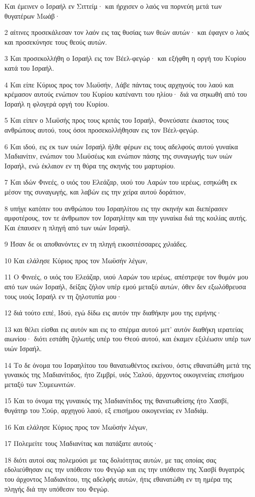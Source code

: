 \par Και έμεινεν ο Ισραήλ εν Σιττείμ· και ήρχισεν ο λαός να πορνεύη μετά των θυγατέρων Μωάβ·
\par 2 αίτινες προσεκάλεσαν τον λαόν εις τας θυσίας των θεών αυτών· και έφαγεν ο λαός και προσεκύνησε τους θεούς αυτών.
\par 3 Και προσεκολλήθη ο Ισραήλ εις τον Βέελ-φεγώρ· και εξήφθη η οργή του Κυρίου κατά του Ισραήλ.
\par 4 Και είπε Κύριος προς τον Μωϋσήν, Λάβε πάντας τους αρχηγούς του λαού και κρέμασον αυτούς ενώπιον του Κυρίου κατέναντι του ηλίου· διά να σηκωθή από του Ισραήλ η φλογερά οργή του Κυρίου.
\par 5 Και είπεν ο Μωϋσής προς τους κριτάς του Ισραήλ, Φονεύσατε έκαστος τους ανθρώπους αυτού, τους όσοι προσεκολλήθησαν εις τον Βέελ-φεγώρ.
\par 6 Και ιδού, εις εκ των υιών Ισραήλ ήλθε φέρων εις τους αδελφούς αυτού γυναίκα Μαδιανίτιν, ενώπιον του Μωϋσέως και ενώπιον πάσης της συναγωγής των υιών Ισραήλ, ενώ έκλαιον εν τη θύρα της σκηνής του μαρτυρίου.
\par 7 Και ιδών Φινεές, ο υιός του Ελεάζαρ, υιού του Ααρών του ιερέως, εσηκώθη εκ μέσον της συναγωγής, και λαβών εις την χείρα αυτού δοράτιον,
\par 8 υπήγε κατόπιν του ανθρώπου του Ισραηλίτου εις την σκηνήν και διεπέρασεν αμφοτέρους, τον τε άνθρωπον τον Ισραηλίτην και την γυναίκα διά της κοιλίας αυτής. Και έπαυσεν η πληγή από των υιών Ισραήλ.
\par 9 Ήσαν δε οι αποθανόντες εν τη πληγή εικοσιτέσσαρες χιλιάδες.
\par 10 Και ελάλησε Κύριος προς τον Μωϋσήν λέγων,
\par 11 Ο Φινεές, ο υιός του Ελεάζαρ, υιού Ααρών του ιερέως, απέστρεψε τον θυμόν μου από των υιών Ισραήλ, δείξας ζήλον υπέρ εμού μεταξύ αυτών, όθεν δεν εξωλόθρευσα τους υιούς Ισραήλ εν τη ζηλοτυπία μου·
\par 12 διά τούτο ειπέ, Ιδού, εγώ δίδω εις αυτόν την διαθήκην μου της ειρήνης·
\par 13 και θέλει είσθαι εις αυτόν και εις το σπέρμα αυτού μετ' αυτόν διαθήκη ιερατείας αιωνίου· διότι εστάθη ζηλωτής υπέρ του Θεού αυτού, και έκαμεν εξιλέωσιν υπέρ των υιών Ισραήλ.
\par 14 Το δε όνομα του Ισραηλίτου του θανατωθέντος εκείνου, όστις εθανατώθη μετά της γυναικός της Μαδιανίτιδος, ήτο Ζιμβρί, υιός Σαλού, άρχοντος οικογενείας επισήμου μεταξύ των Συμεωνιτών.
\par 15 Και το όνομα της γυναικός της Μαδιανίτιδος της θανατωθείσης ήτο Χασβί, θυγάτηρ του Σούρ, αρχηγού λαού, εξ επισήμου οικογενείας εν Μαδιάμ.
\par 16 Και ελάλησε Κύριος προς τον Μωϋσήν λέγων,
\par 17 Πολεμείτε τους Μαδιανίτας και πατάξατε αυτούς·
\par 18 διότι αυτοί σας πολεμούσι με τας δολιότητας αυτών, με τας οποίας σας εδολιεύθησαν εις την υπόθεσιν του Φεγώρ και εις την υπόθεσιν της Χασβί θυγατρός του άρχοντος Μαδιανίτου, της αδελφής αυτών, ήτις εθανατώθη εν τη ημέρα της πληγής διά την υπόθεσιν του Φεγώρ.

